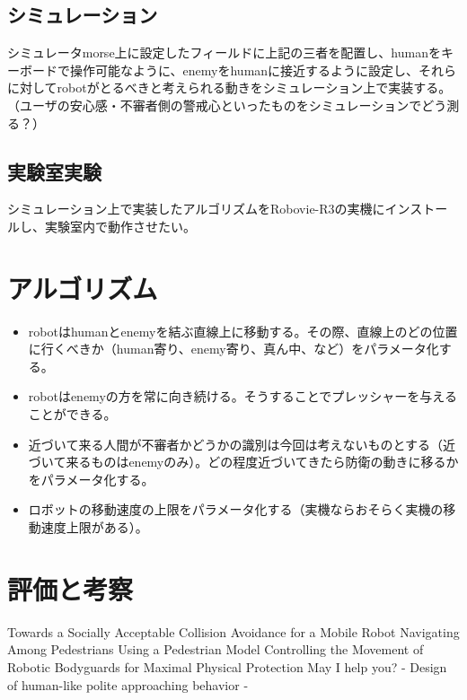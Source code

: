 \documentclass[12pt]{jsarticle}
\begin{document}
\subsection{シミュレーション}
シミュレータmorse上に設定したフィールドに上記の三者を配置し、humanをキーボードで操作可能なように、enemyをhumanに接近するように設定し、それらに対してrobotがとるべきと考えられる動きをシミュレーション上で実装する。
（ユーザの安心感・不審者側の警戒心といったものをシミュレーションでどう測る？）

\subsection{実験室実験}
シミュレーション上で実装したアルゴリズムをRobovie-R3の実機にインストールし、実験室内で動作させたい。

\section{アルゴリズム}
\begin{itemize}
	\item robotはhumanとenemyを結ぶ直線上に移動する。その際、直線上のどの位置に行くべきか（human寄り、enemy寄り、真ん中、など）をパラメータ化する。
	\item robotはenemyの方を常に向き続ける。そうすることでプレッシャーを与えることができる。
	\item 近づいて来る人間が不審者かどうかの識別は今回は考えないものとする（近づいて来るものはenemyのみ）。どの程度近づいてきたら防衛の動きに移るかをパラメータ化する。
	\item ロボットの移動速度の上限をパラメータ化する（実機ならおそらく実機の移動速度上限がある）。
\end{itemize}



\section{評価と考察}

\begin{thebibliography}{3}
 Towards a Socially Acceptable Collision Avoidance for a Mobile Robot Navigating Among Pedestrians Using a Pedestrian Model
 Controlling the Movement of Robotic Bodyguards for Maximal Physical Protection
 May I help you? - Design of human-like polite approaching behavior -
\end{thebibliography}
\end{document}
